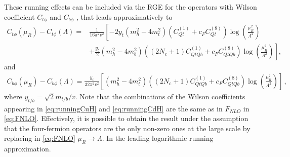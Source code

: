 	\par These running effects can be included via the RGE for the operators with Wilson coefficient $C_{t\phi}$  and $C_{b\phi}$  \cite{Jenkins:2013zja, Jenkins:2013wua}, that leads approximatively to 
	\begin{equation}
		\begin{split}
			C_{t\phi}(\mu_R)-C_{t\phi}(\Lambda)= &\frac{1}{16 \pi^2 v^2} \left[-2  y_t (m_h^2  -4 m_t^2) (C_{Qt}^{(1)}+c_F C_{Qt}^{(8)} )\log\left( \frac{\mu_R^2}{\Lambda^2}\right) \right.\\
			& \left.+ \frac{y_b}{2} (m_h^2-4 m_b^2)\left(  (2N_c+1)  C_{QtQb}^{(1)}+   c_F C_{QtQb}^{(8)}\right)\log\left( \frac{\mu_R^2}{\Lambda^2}\right)\right], \label{eq:runningCuH}
		\end{split}
	\end{equation}
	and
	\begin{equation}
		\begin{split}
			C_{b\phi}(\mu_R)-C_{b\phi}(\Lambda)= \frac{y_t}{32 \pi^2 v^2} \left[  (m_h^2-4 m_t^2)\left(  (2N_c+1)  C_{QtQb}^{(1)}+   c_F C_{QtQb}^{(8)}\right)\log\left( \frac{\mu_R^2}{\Lambda^2}\right)\right]\,, \label{eq:runningCdH}
		\end{split}
	\end{equation}
	where $y_{t/b}=\sqrt{2} m_{t/b}/v$.
	Note that the combinations of the Wilson coefficients appearing in \eqref{eq:runningCuH} and \eqref{eq:runningCdH} are the same as in $F_{NLO}$ in \eqref{eq:FNLO}.
	Effectively, it is possible to obtain the result under the assumption that the four-fermion operators are the only non-zero ones at the large scale by replacing in \eqref{eq:FNLO} $\mu_R \to \Lambda$. In the leading logarithmic running approximation.

